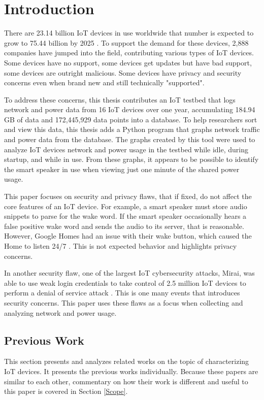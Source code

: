 \chapter{Introduction}
\label{Introduction}
There are 23.14 billion IoT devices in use worldwide that number is expected to grow to 75.44 billion by 2025 \cite{statista_2016}. To support the demand for these devices, 2,888 companies have jumped into the field, contributing various types of IoT devices. Some devices have no support, some devices get updates but have bad support, some devices are outright malicious. Some devices have privacy and security concerns even when brand new and still technically "supported".

To address these concerns, this thesis contributes an IoT testbed that logs network and power data from 16 IoT devices over one year, accumulating 184.94 GB of data and 172,445,929 data points into a database. To help researchers sort and view this data, this thesis adds a Python \cite{python} program that graphs network traffic and power data from the database. The graphs created by this tool were used to analyze IoT devices network and power usage in the testbed while idle, during startup, and while in use. From these graphs, it appears to be possible to identify the smart speaker in use when viewing just one minute of the shared power usage.

This paper focuses on security and privacy flaws, that if fixed, do not affect the core features of an IoT device. For example, a smart speaker must store audio snippets to parse for the wake word. If the smart speaker occasionally hears a false positive wake word and sends the audio to its server, that is reasonable. However, Google Homes had an issue with their wake button, which caused the Home to listen 24/7 \cite{burke_2017}. This is not expected behavior and highlights privacy concerns.

In another security flaw, one of the largest IoT cybersecurity attacks, Mirai, was able to use weak login credentials to take control of 2.5 million IoT devices to perform a denial of service attack \cite{whittaker_2017}. This is one many events that introduces security concerns. This paper uses these flaws as a focus when collecting and analyzing network and power usage.

\section{Previous Work}
\label{Previous Work}
This section presents and analyzes related works on the topic of characterizing IoT devices. It presents the previous works individually. Because these papers are similar to each other, commentary on how their work is different and useful to this paper is covered in Section \ref{Scope}.

